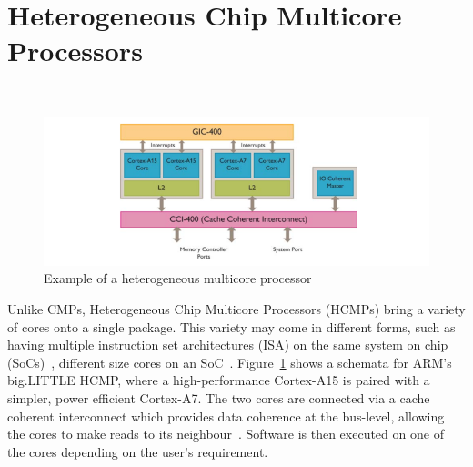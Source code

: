 \section{Heterogeneous Chip Multicore Processors}~\label{sec:hcmp}

\begin{figure}[t]
 \center
 \includegraphics[width=1\textwidth]{background/graphics/biglittle.png}
 	\vspace{-3em}

 \caption{Example of a heterogeneous multicore processor~\cite{armbig}}\label{fig:blarm}
\end{figure}
\vspace{-1em}

Unlike CMPs, Heterogeneous Chip Multicore Processors (HCMPs) bring a variety of cores onto a single package.
This variety may come in different forms, such as having multiple instruction set architectures (ISA) on the same system on chip (SoCs)~\cite{venkat2014harnessingisa,venkatHipstr2016}, different size cores on an SoC~\cite{armbig,jeff2012big}.
Figure~\ref{fig:blarm} shows a schemata for ARM's big.LITTLE HCMP, where a high-performance Cortex-A15 is paired with a simpler, power efficient Cortex-A7.
The two cores are connected via a cache coherent interconnect which provides data coherence at the bus-level, allowing the cores to make reads to its neighbour~\cite{armbig}.
Software is then executed on one of the cores depending on the user's requirement.

